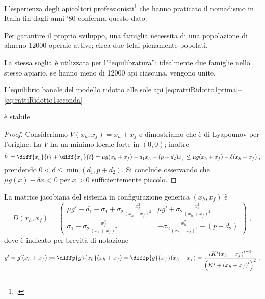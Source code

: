 L'esperienza degli apicoltori professionisti\footcite{privFDL,privFPan} che hanno praticato il nomadismo in Italia
fin dagli anni '80 conferma questo dato:
\begin{displayquote}
Per garantire il proprio sviluppo, una famiglia necessita di una popolazione di
almeno 12000 operaie attive; circa due telai pienamente popolati.

La stessa soglia è utilizzata per l'``equilibratura'': idealmente due famiglie nello stesso apiario,
se hanno meno di 12000 api ciascuna, vengono unite.
\end{displayquote}

\begin{proposizione}
    L'equilibrio banale del modello ridotto alle sole api
    \eqref{eq:rattiRidotto1prima}--\eqref{eq:rattiRidotto1seconda}

    è stabile.
    \label{prop:r0Stab2d}
\end{proposizione}

\begin{proof}
Consideriamo $V(x_h, x_f) = x_h + x_f$ e dimostriamo che è di Lyapounov per l'origine.
La $V$ ha un minimo locale forte in $(0,0)$; inoltre
$$\dot{V} = \diff{x_h}{t} + \diff{x_f}{t} = \mu g(x_h + x_f) -d_1 x_h - (p+d_2) x_f
\leq
 \mu g(x_h + x_f) - \delta (x_h + x_f)
\; ,$$
prendendo $0 < \delta \leq \min (d_1, p + d_2)$.
Si conclude osservando che $\mu g(x) - \delta x <0$ per $x>0$ sufficientemente piccolo.
\end{proof}

La matrice jacobiana del sistema in configurazione generica $(x_h, x_f)$ è
\begin{equation}
    D(x_h, x_f) =
    \begin{pmatrix}
        \mu g' -d_1 - \sigma_1 + \sigma_2 \frac{x_f^2}{{(x_h+x_f)}^2}
        & \mu g' + \sigma_2 \frac{x_h^2}{{(x_h+x_f)}^2}
        \\
        \sigma_1 - \sigma_2 \frac{x_f^2}{{(x_h+x_f)}^2}
        & - \sigma_2 \frac{x_h^2}{{(x_h+x_f)}^2} - (p+d_2)
    \end{pmatrix} \; ,
    \label{eq:r17jaco}
\end{equation}
dove è indicato per brevità di notazione
\begin{equation}
    g' = g'(x_h+x_f) \coloneq \diffp{g}{{x_h}} (x_h + x_f) = \diffp{g}{{x_f}} (x_h + x_f) =
    \frac{ iK^i {(x_h + x_f)}^{i-1} }{ { \left( K^i + {(x_h +x_f)}^i \right)  }^2 }
    \; .
    \label{eq:gPrimo}
\end{equation}

